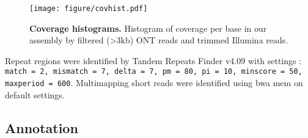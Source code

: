 \begin{kframe}
\begin{alltt}
 \hlkwb{<-} 
 \hlkwb{<-} 
 \hlkwb{<-} 
 \hlkwb{<-} 
 \hlkwb{<-} 
 \hlkwb{<-} 

 \hlkwb{<-} \hlstd{(} \hlstr{'.pdf\}
\textbackslash{}\textbackslash{}caption['}\hlstr{']\{\{\textbackslash{}\textbackslash{}bf '}\hlstd{)}
\end{alltt}
\end{kframe}\begin{figure}[!ht]
\centering
\texttt{[image: figure/covhist.pdf]}
\caption[Coverage histograms]{{\bf Coverage histograms.} Histogram of coverage per base in our assembly by filtered (>3kb) ONT reads and trimmed Illumina reads. }
\label{fig:covhist}
\end{figure}


Repeat regions were identified by Tandem Repeats Finder v4.09 \citep{Benson1999-lr} with settings \citep{Xu2020-ta}: \texttt{match = 2, mismatch = 7, delta = 7, pm = 80, pi = 10, minscore = 50, maxperiod = 600}. Multimapping short reads were identified using bwa mem \citep{Li2013-ec} on default settings.

\subsection{Annotation}
\label{sec:methods}

